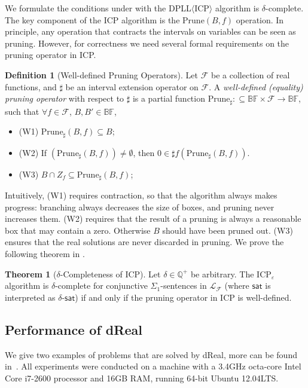 \documentclass[10pt]{article}
\theoremstyle{definition}
\newtheorem{definition}{Definition}[section]
\newtheorem{theorem}{Theorem}[section]
\begin{document}
We formulate the conditions under with the DPLL$\langle$ICP$\rangle$ algorithm is $\delta$-complete. The key component of the ICP algorithm is the $\mathrm{Prune}(B, f)$ operation. In principle, any operation that contracts the intervals on variables can be seen as pruning. However, for correctness we need several formal requirements on the pruning operator in ICP. 
\begin{definition}[Well-defined Pruning Operators]\label{well}
Let $\mathcal{F}$ be a collection of real functions, and $\sharp$ be an interval extension operator on $\mathcal{F}$. A {\em well-defined (equality) pruning operator} with respect to $\sharp$ is a partial function $\mathrm{Prune}_{\sharp} : \subseteq \mathbb{BF}\times \mathcal{F}\rightarrow \mathbb{BF}$, such that $\forall f\in \mathcal{F}$, $B,B'\in \mathbb{BF}$, 
\begin{itemize}
\item (W1) $\mathrm{Prune}_{\sharp}(B, f)\subseteq B$;
\item (W2) If $(\mathrm{Prune}_{\sharp}(B,f))\neq \emptyset$, then $0\in \sharp f(\mathrm{Prune}_{\sharp}(B,f))$. 
\item (W3) $B \cap Z_f \subseteq \mathrm{Prune}_{\sharp}(B, f)$;
\end{itemize}
\end{definition}
Intuitively, (W1) requires contraction, so that the algorithm always makes progress: branching always decreases the size of boxes, and pruning never increases them. (W2) requires that the result of a pruning is always a reasonable box that may contain a zero. Otherwise $B$ should have been pruned out. (W3) ensures that the real solutions are never discarded in pruning. We prove the following theorem in \cite{DBLP:conf/cade/GaoAC12}. 
\begin{theorem}[$\delta$-Completeness of ICP]\label{main-theorem}
Let $\delta\in \mathbb{Q}^+$ be arbitrary. The $\mathrm{ICP}_{\varepsilon}$ algorithm is $\delta$-complete for conjunctive $\Sigma_1$-sentences in $\mathcal{L}_{\mathcal{F}}$ (where $\mathsf{sat}$ is interpreted as $\delta$-$\mathsf{sat}$) if and only if the pruning operator in ICP is well-defined. 
\end{theorem}

\subsection*{Performance of dReal}

We give two examples of problems that are solved by dReal, more can be found in~\cite{DBLP:conf/fmcad/GaoKC13,DBLP:conf/hybrid/KapinskiDSA14,DBLP:conf/cade/GaoKC13}.  All experiments were conducted on a machine with a 3.4GHz
octa-core Intel Core i7-2600 processor and 16GB RAM, running 64-bit Ubuntu 12.04LTS. 
\end{document}
